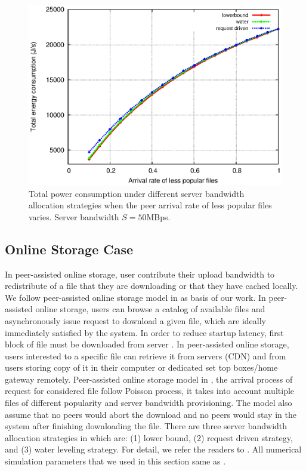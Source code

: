 \documentclass[conference]{IEEEtran}
\begin{document}
\begin{figure}[ht]
\hfill
\centering
\begin{minipage}[b]{0.3\linewidth}
	\includegraphics[scale=0.4]{graphs/totalconsumption.eps}
	\caption{Total power consumption under different server bandwidth allocation strategies when the peer arrival rate of less popular files varies. Server bandwidth $S=50$MBps.}
	\label{fig:totalpop}
\end{minipage}
\label{fig:popularity}
\end{figure}


\subsection{Online Storage Case}\label{subsec:onlinestorage}

In peer-assisted online storage, user contribute their upload bandwidth to redistribute of a file that they are downloading or that they have cached locally.
We follow peer-assisted online storage model in \cite{Sun:2009:POS:1542245.1542249} as basis of our work. 
In peer-assisted online storage, users can browse a catalog of available files and asynchronously issue request to download a given file, which are ideally immediately satisfied by the system.
In order to reduce startup latency, first block of file must be downloaded from server \cite{5199550}.
In peer-assisted online storage, users interested to a specific file can retrieve it from servers (CDN) and from users storing copy of it in their computer or dedicated set top boxes/home gateway remotely.  
Peer-assisted online storage model in \cite{Sun:2009:POS:1542245.1542249}, the arrival process of request for considered file follow Poisson process, it takes into account multiple files of different popularity and server bandwidth provisioning.
The model also assume that no peers would abort the download and no peers would stay in the system after finishing downloading the file.
There are three server bandwidth allocation strategies in \cite{Sun:2009:POS:1542245.1542249} which are: (1) lower bound, (2) request driven strategy, and (3) water leveling strategy.
For detail, we refer the readers to \cite{Sun:2009:POS:1542245.1542249,5199550,5061997}.
All numerical simulation parameters that we used in this section same as \cite{Sun:2009:POS:1542245.1542249}.
\end{document}
